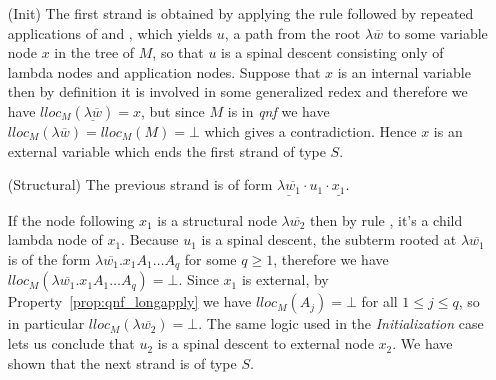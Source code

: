 \documentclass{elsarticle}
\theoremstyle{plain}
\theoremstyle{definition}
\begin{document}
\begin{enumerate}
\item[(Init)] The first strand is obtained by applying the rule  followed by repeated applications of  and , which yields $u$, a path from the root $\lambda\overline{w}$ to some variable node $x$ in the tree of $M$, so that $u$ is a spinal descent consisting only of lambda nodes and application nodes.
Suppose that $x$ is an internal variable then by definition it is
involved in some generalized redex and therefore we have $lloc_M(\underline{\lambda\overline{w}}) = x$, but since $M$ is in \emph{qnf} we have $lloc_M(\lambda \overline{w}) = lloc_M(M) = \bot$ which gives a contradiction.
Hence $x$ is an external variable which ends the first strand of type $S$.

\item[(Structural)] The previous strand is of form $\underline{\lambda\overline{w_1}} \cdot u_1 \cdot \underline{x_1} $.

If the node following $x_1$ is a structural node $\lambda\overline{w_2}$ then by rule , it's a child lambda node of $x_1$.
Because $u_1$ is a spinal descent, the subterm rooted at $\lambda \overline{w_1}$ is of the form $\lambda \overline{w_1} . x_1 A_1 \ldots A_q$ for some $q\geq1$, therefore we have $lloc_M(\lambda \overline{w_1} . x_1 A_1 \ldots A_q) = \bot$. Since $x_1$ is external, by Property~\ref{prop:qnf_longapply} we have $lloc_M(A_j)=\bot$ for all $1\leq j\leq q$, so in particular $lloc_M(\lambda\overline{w_2}) = \bot$. The same logic used in the \emph{Initialization} case lets us conclude that $u_2$ is a spinal descent to external node $x_2$. We have shown that the next strand is of type $S$.
\\


\end{enumerate}
\end{document}
